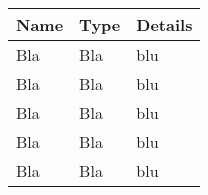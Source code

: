 \begin{tabular}{lll}

\toprule
\textbf{Name}   & \textbf{Type}     & \textbf{Details}        \\ \midrule
Bla             & Bla               & blu                     \\
Bla             & Bla               & blu                     \\
Bla             & Bla               & blu                     \\ \midrule
Bla             & Bla               & blu                     \\
Bla             & Bla               & blu                     \\

\bottomrule
\end{tabular}
